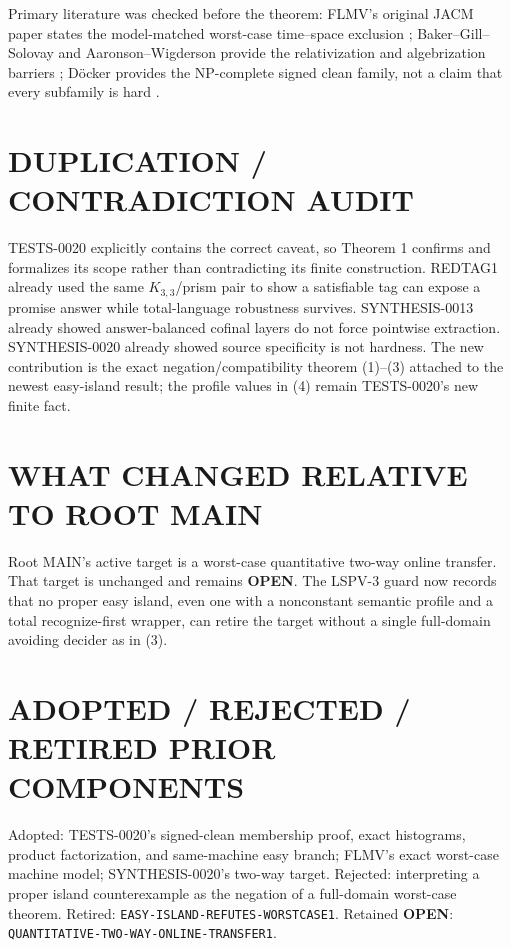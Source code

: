 \documentclass[11pt]{article}
\newcommand{\OPEN}{\textbf{OPEN}}
\begin{document}
Primary literature was checked before the theorem: FLMV's original JACM
paper states the model-matched worst-case time--space exclusion
\cite{FLMV05}; Baker--Gill--Solovay and Aaronson--Wigderson provide the
relativization and algebrization barriers \cite{BGS75,AW09}; D\"ocker provides
the NP-complete signed clean family, not a claim that every subfamily is hard
\cite{Docker19}.

\section{DUPLICATION / CONTRADICTION AUDIT}

TESTS-0020 explicitly contains the correct caveat, so Theorem 1 confirms and
formalizes its scope rather than contradicting its finite construction.
REDTAG1 already used the same $K_{3,3}$/prism pair to show a satisfiable tag
can expose a promise answer while total-language robustness survives.
SYNTHESIS-0013 already showed answer-balanced cofinal layers do not force
pointwise extraction.  SYNTHESIS-0020 already showed source specificity is
not hardness.  The new contribution is the exact negation/compatibility
theorem (1)--(3) attached to the newest easy-island result; the profile values
in (4) remain TESTS-0020's new finite fact.

\section{WHAT CHANGED RELATIVE TO ROOT MAIN}

Root MAIN's active target is a worst-case quantitative two-way online
transfer.  That target is unchanged and remains \OPEN.  The LSPV-3 guard now
records that no proper easy island, even one with a nonconstant semantic
profile and a total recognize-first wrapper, can retire the target without a
single full-domain avoiding decider as in (3).

\section{ADOPTED / REJECTED / RETIRED PRIOR COMPONENTS}

Adopted: TESTS-0020's signed-clean membership proof, exact histograms, product
factorization, and same-machine easy branch; FLMV's exact worst-case machine
model; SYNTHESIS-0020's two-way target.  Rejected: interpreting a proper
island counterexample as the negation of a full-domain worst-case theorem.
Retired: \texttt{EASY-ISLAND-REFUTES-WORSTCASE1}.  Retained \OPEN:
\texttt{QUANTITATIVE-TWO-WAY-ONLINE-TRANSFER1}.
\end{document}
